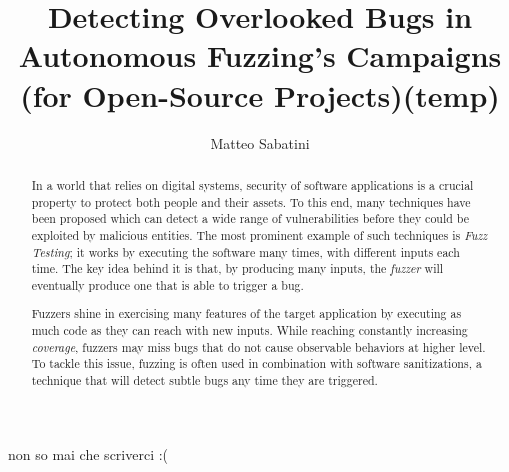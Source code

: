 \documentclass[binding=0.6cm, oneside]{sapthesis}%
\title{Detecting Overlooked Bugs in Autonomous Fuzzing's Campaigns (for Open-Source Projects)(temp)}
\author{Matteo Sabatini}
\begin{document}
\frontmatter
\maketitle

\begin{acknowledgments}
non so mai che scriverci :(
\end{acknowledgments}


\begin{abstract}

	In a world that relies on digital systems, security of software applications is a crucial property to protect both people and their assets. To this end, many techniques have been proposed which can detect a wide range of vulnerabilities before they could be exploited by malicious entities. The most prominent example of such techniques is \textit{Fuzz Testing}; it works by executing the software many times, with different inputs each time. The key idea behind it is that, by producing many inputs, the \textit{fuzzer} will eventually produce one that is able to trigger a bug.

	Fuzzers shine in exercising many features of the target application by executing as much code as they can reach with new inputs. While reaching constantly increasing \textit{coverage}, fuzzers may miss bugs that do not cause observable behaviors at higher level. To tackle this issue, fuzzing is often used in combination with software sanitizations, a technique that will detect subtle bugs any time they are triggered.

\end{abstract}




\tableofcontents


\titleformat{\chapter}[display]  
{\normalfont\Huge\bfseries}{\chaptertitlename\ \thechapter}{20pt}{\huge}  
\titlespacing{\chapter}{0pt}{0pt}{0pt}  

\mainmatter
















\backmatter
{}

\end{document}
